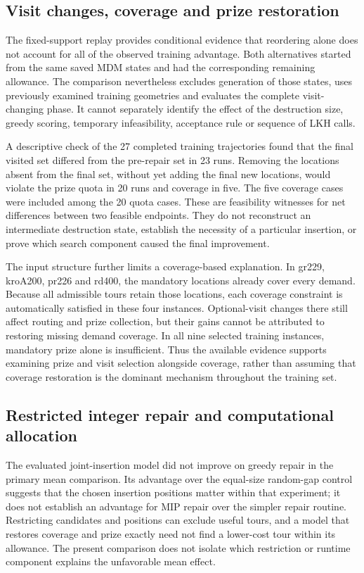 \subsection{Visit changes, coverage and prize restoration}
The fixed-support replay provides conditional evidence that reordering alone
does not account for all of the observed training advantage. Both alternatives
started from the same saved MDM states and had the corresponding remaining
allowance. The comparison nevertheless excludes generation of those states,
uses previously examined training geometries and evaluates the complete
visit-changing phase. It cannot separately identify the effect of the
destruction size, greedy scoring, temporary infeasibility, acceptance rule or
sequence of LKH calls.

A descriptive check of the 27 completed training trajectories found that
the final visited set differed from the pre-repair set in 23 runs. Removing
the locations absent from the final set, without yet adding the final new
locations, would violate the prize quota in 20 runs and coverage in five.
The five coverage cases were included among the 20 quota cases. These are
feasibility witnesses for net differences between two feasible endpoints.
They do not reconstruct an intermediate destruction state, establish the
necessity of a particular insertion, or prove which search component caused
the final improvement.

The input structure further limits a coverage-based explanation. In gr229,
kroA200, pr226 and rd400, the mandatory locations already cover every demand.
Because all admissible tours retain those locations, each coverage constraint
is automatically satisfied in these four instances. Optional-visit changes
there still affect routing and prize collection, but their gains cannot be
attributed to restoring missing demand coverage. In all nine selected training
instances, mandatory prize alone is insufficient. Thus the available evidence
supports examining prize and visit selection alongside coverage, rather than
assuming that coverage restoration is the dominant mechanism throughout the
training set.

\subsection{Restricted integer repair and computational allocation}
The evaluated joint-insertion model did not improve on greedy repair in the
primary mean comparison. Its advantage over the equal-size random-gap control
suggests that the chosen insertion positions matter within that experiment;
it does not establish an advantage for MIP repair over the simpler repair
routine. Restricting candidates and positions can exclude useful tours, and
a model that restores coverage and prize exactly need not find a lower-cost
tour within its allowance. The present comparison does not isolate which
restriction or runtime component explains the unfavorable mean effect.

